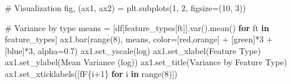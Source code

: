 \documentclass[
  letterpaper,
  DIV=11,
  numbers=noendperiod]{scrartcl}
\newenvironment{Shaded}{\begin{snugshade}}{\end{snugshade}}
\newcommand{\BuiltInTok}[1]{\textcolor[rgb]{0.00,0.23,0.31}{#1}}
\newcommand{\CommentTok}[1]{\textcolor[rgb]{0.37,0.37,0.37}{#1}}
\newcommand{\ControlFlowTok}[1]{\textcolor[rgb]{0.00,0.23,0.31}{\textbf{#1}}}
\newcommand{\DecValTok}[1]{\textcolor[rgb]{0.68,0.00,0.00}{#1}}
\newcommand{\FloatTok}[1]{\textcolor[rgb]{0.68,0.00,0.00}{#1}}
\newcommand{\KeywordTok}[1]{\textcolor[rgb]{0.00,0.23,0.31}{\textbf{#1}}}
\newcommand{\NormalTok}[1]{\textcolor[rgb]{0.00,0.23,0.31}{#1}}
\newcommand{\OperatorTok}[1]{\textcolor[rgb]{0.37,0.37,0.37}{#1}}
\newcommand{\SpecialCharTok}[1]{\textcolor[rgb]{0.37,0.37,0.37}{#1}}
\newcommand{\SpecialStringTok}[1]{\textcolor[rgb]{0.13,0.47,0.30}{#1}}
\newcommand{\StringTok}[1]{\textcolor[rgb]{0.13,0.47,0.30}{#1}}
\renewenvironment{Shaded}{%
  \begin{tcolorbox}[%
    enhanced,%
    colback=codebg,%
    colframe=codebg,%
    borderline west={3pt}{0pt}{sectionblue},%
    fontupper=\small\ttfamily,%
    boxrule=0pt,%
    arc=0pt,%
    boxsep=5pt,%
    left=2mm,%
    right=2mm,%
    top=2mm,%
    bottom=2mm%
  ]%
}{%
  \end{tcolorbox}%
}
\begin{document}
\begin{Shaded}
\begin{Highlighting}[]
\CommentTok{\# Visualization}
\NormalTok{fig, (ax1, ax2) }\OperatorTok{=}\NormalTok{ plt.subplots(}\DecValTok{1}\NormalTok{, }\DecValTok{2}\NormalTok{, figsize}\OperatorTok{=}\NormalTok{(}\DecValTok{10}\NormalTok{, }\DecValTok{3}\NormalTok{))}

\CommentTok{\# Variance by type}
\NormalTok{means }\OperatorTok{=}\NormalTok{ [df[feature\_types[ft]].var().mean() }\ControlFlowTok{for}\NormalTok{ ft }\KeywordTok{in}\NormalTok{ feature\_types]}
\NormalTok{ax1.bar(}\BuiltInTok{range}\NormalTok{(}\DecValTok{8}\NormalTok{), means, color}\OperatorTok{=}\NormalTok{[}\StringTok{\textquotesingle{}red\textquotesingle{}}\NormalTok{,}\StringTok{\textquotesingle{}orange\textquotesingle{}}\NormalTok{] }\OperatorTok{+}\NormalTok{ [}\StringTok{\textquotesingle{}green\textquotesingle{}}\NormalTok{]}\OperatorTok{*}\DecValTok{3} \OperatorTok{+}\NormalTok{ [}\StringTok{\textquotesingle{}blue\textquotesingle{}}\NormalTok{]}\OperatorTok{*}\DecValTok{3}\NormalTok{, alpha}\OperatorTok{=}\FloatTok{0.7}\NormalTok{)}
\NormalTok{ax1.set\_yscale(}\StringTok{\textquotesingle{}log\textquotesingle{}}\NormalTok{)}
\NormalTok{ax1.set\_xlabel(}\StringTok{\textquotesingle{}Feature Type\textquotesingle{}}\NormalTok{)}
\NormalTok{ax1.set\_ylabel(}\StringTok{\textquotesingle{}Mean Variance (log)\textquotesingle{}}\NormalTok{)}
\NormalTok{ax1.set\_title(}\StringTok{\textquotesingle{}Variance by Feature Type\textquotesingle{}}\NormalTok{)}
\NormalTok{ax1.set\_xticklabels([}\SpecialStringTok{f\textquotesingle{}F}\SpecialCharTok{\{}\NormalTok{i}\OperatorTok{+}\DecValTok{1}\SpecialCharTok{\}}\SpecialStringTok{\textquotesingle{}} \ControlFlowTok{for}\NormalTok{ i }\KeywordTok{in} \BuiltInTok{range}\NormalTok{(}\DecValTok{8}\NormalTok{)])}


\end{Highlighting}
\end{Shaded}
\end{document}
